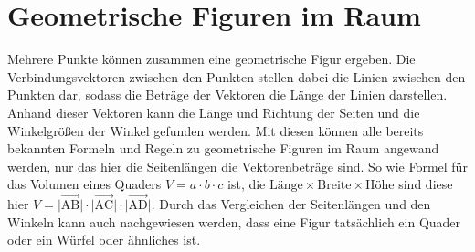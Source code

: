 \documentclass{article}
\begin{document}
  
\newcommand{\normp}[1]{\big| \vectp{#1} \big|}  
\newcommand{\norm}[1]{\big| {#1} \big|}  
\newcommand{\vectp}[1]{\vect{\mathrm{#1}}}
\newcommand{\vect}[1]{\overrightarrow{#1}} 
 
\section{Geometrische Figuren im Raum} 
\begin{minipage}{\dimexpr\linewidth-5cm}
 Mehrere Punkte können zusammen eine geometrische Figur ergeben. Die Verbindungsvektoren zwischen den Punkten stellen dabei die Linien zwischen den Punkten dar, sodass die Beträge der Vektoren die Länge der Linien darstellen. \newline
 Anhand dieser Vektoren kann die Länge und Richtung der Seiten und die Winkelgrößen der Winkel gefunden werden. \newline
 Mit diesen können alle bereits bekannten Formeln und Regeln zu geometrische Figuren im Raum angewand werden, nur das hier die Seitenlängen die Vektorenbeträge sind. So wie Formel für das Volumen eines Quaders $V = a \cdot b \cdot c$ ist, die $\text{Länge} \times \text{Breite} \times \text{Höhe}$ sind diese hier $V = \normp{AB} \cdot \normp{AC} \cdot \normp{AD}$. Durch das Vergleichen der Seitenlängen und den Winkeln kann auch nachgewiesen werden, dass eine Figur tatsächlich ein Quader oder ein Würfel oder ähnliches ist.
\end{minipage}
\hfill
\begin{minipage}{5cm}
 \center 
\end{minipage} 
 
 
\end{document}
